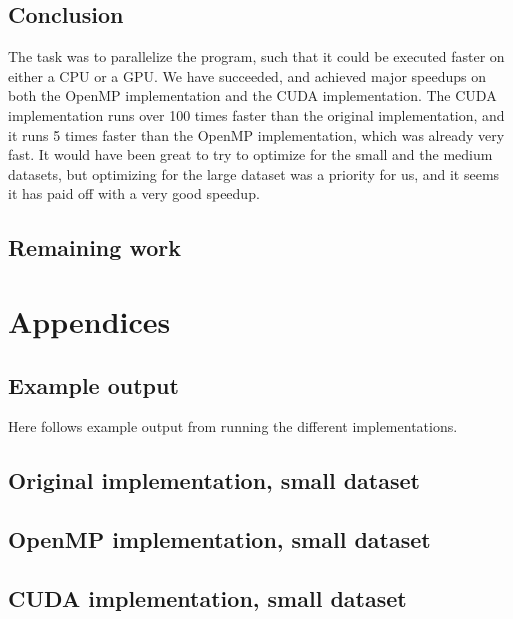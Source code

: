 \documentclass[11pt]{article}
\begin{document}
\subsection{Conclusion}
The task was to parallelize the program, such that it could be executed faster
on either a CPU or a GPU. We have succeeded, and achieved major speedups on 
both the OpenMP implementation and the CUDA implementation. The CUDA implementation
runs over 100 times faster than the original implementation, and it runs 5 times 
faster than the OpenMP implementation, which was already very fast. It would have
been great to try to optimize for the small and the medium datasets, but optimizing
for the large dataset was a priority for us, and it seems it has paid off with a 
very good speedup.

\subsection{Remaining work}


\newpage
\section{Appendices}
\subsection{Example output}
Here follows example output from running the different implementations.

\subsection{Original implementation, small dataset}

\subsection{OpenMP implementation, small dataset}

\subsection{CUDA implementation, small dataset}

\end{document}
